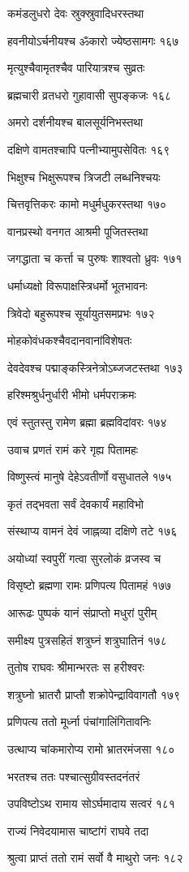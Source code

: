 कमंडलुधरो देवः स्रुक्स्रुवादिधरस्तथा

हवनीयोऽर्चनीयश्च ॐकारो ज्येष्ठसामगः १६७

मृत्युश्चैवामृतश्चैव पारियात्रश्च सुव्रतः

ब्रह्मचारी व्रतधरो गुहावासी सुपङ्कजः १६८

अमरो दर्शनीयश्च बालसूर्यनिभस्तथा

दक्षिणे वामतश्चापि पत्नीभ्यामुपसेवितः १६९

भिक्षुश्च भिक्षुरूपश्च त्रिजटी लब्धनिश्चयः

चित्तवृत्तिकरः कामो मधुर्मधुकरस्तथा १७०

वानप्रस्थो वनगत आश्रमी पूजितस्तथा

जगद्धाता च कर्त्ता च पुरुषः शाश्वतो ध्रुवः १७१

धर्माध्यक्षो विरूपाक्षस्त्रिधर्मो भूतभावनः

त्रिवेदो बहुरूपश्च सूर्यायुतसमप्रभः १७२

मोहकोवंधकश्चैवदानवानांविशेषतः

देवदेवश्च पद्माङ्कस्त्रिनेत्रोऽब्जजटस्तथा १७३

हरिश्मश्रुर्धनुर्धारी भीमो धर्मपराक्रमः

एवं स्तुतस्तु रामेण ब्रह्मा ब्रह्मविदांवरः १७४

उवाच प्रणतं रामं करे गृह्य पितामहः

विष्णुस्त्वं मानुषे देहेऽवतीर्णो वसुधातले १७५

कृतं तद्भवता सर्वं देवकार्यं महाविभो

संस्थाप्य वामनं देवं जाह्नव्या दक्षिणे तटे १७६

अयोध्यां स्वपुरीं गत्वा सुरलोकं व्रजस्व च

विसृष्टो ब्रह्मणा रामः प्रणिपत्य पितामहं १७७

आरूढः पुष्पकं यानं संप्राप्तो मधुरां पुरीम्

समीक्ष्य पुत्रसहितं शत्रुघ्नं शत्रुघातिनं १७८

तुतोष राघवः श्रीमान्भरतः स हरीश्वरः

शत्रुघ्नो भ्रातरौ प्राप्तौ शक्रोपेन्द्राविवागतौ १७९

प्रणिपत्य ततो मूर्ध्ना पंचांगालिंगितावनिः

उत्थाप्य चांकमारोप्य रामो भ्रातरमंजसा १८०

भरतश्च ततः पश्चात्सुग्रीवस्तदनंतरं

उपविष्टोऽथ रामाय सोऽर्घमादाय सत्वरं १८१

राज्यं निवेदयामास चाष्टांगं राघवे तदा

श्रुत्वा प्राप्तं ततो रामं सर्वो वै माथुरो जनः १८२

